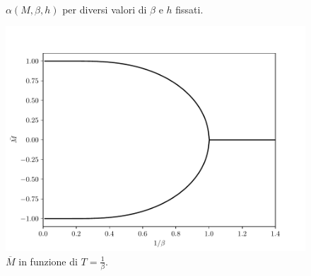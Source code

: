 \iffigureon
\begin{figure}[p]
    \centering
    \subfloat{}
    \subfloat{} \\
    \subfloat{}
    \subfloat{}
    \caption{$ \alpha(M,\beta,h) $ per diversi valori di $ \beta $ e $ h $ fissati.}
    \label{fig:alpha}
\end{figure}
\begin{figure}[p]
    \centering
    \includegraphics[scale=0.8]{img/cw/transizione.pdf}
    \caption{$ \overline{M} $ in funzione di $ T = \frac{1}{\beta}$.}
    \label{fig:transizione}
\end{figure}
\fi

